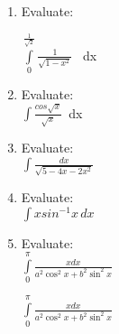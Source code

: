 \begin{enumerate}
\item Evaluate:
    
\hspace{39pt} $\int\limits_{0}^{\frac{1}{\sqrt{2}}} \frac{1}{\sqrt{1 - x^2}}$ \, dx 
   

\item Evaluate:\\
    
\hspace{39pt} $\int\frac{cos\sqrt{x}}{\sqrt{x}}$\, dx\\
    
\item Evaluate:\\
    
\hspace{39pt}$\int \frac{dx}{\sqrt{5-4x-2x^2}}$ \\
\vspace{10pt}
\item Evaluate:\\

\hspace{39pt}$\int x sin^{-1}{x}\,dx$\\
    

\item Evaluate:\\
    
\hspace{39pt} $\int\limits_{0}^{\pi}\frac{x dx}{a^2 \cos^2 x + b^2 \sin^2 x}$ \\
\vspace{10pt}
    
\hspace{39pt} $\int\limits_{0}^{\pi} \frac{x dx}{a^2 \cos^2 x + b^2 \sin^2 x}$ \\

\end{enumerate}



